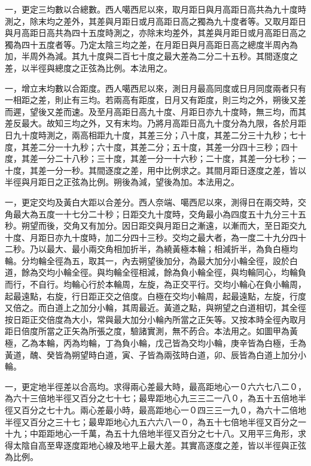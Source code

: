 \begin{pinyinscope}
一，更定三均數以合總數。西人噶西尼以來，取月距日與月高距日高共為九十度時測之，除末均之差外，其差與月距日或月高距日高之獨為九十度者等。又取月距日與月高距日高共為四十五度時測之，亦除末均差外，其差與月距日或月高距日高之獨為四十五度者等。乃定太陰三均之差，在月距日與月高距日高之總度半周內為加，半周外為減。其九十度與二百七十度之最大差為二分二十五秒。其間逐度之差，以半徑與總度之正弦為比例。本法用之。

一，增立末均數以合距度。西人噶西尼以來，測日月最高同度或日月同度兩者只有一相距之差，則止有三均。若兩高有距度，日月又有距度，則三均之外，朔後又差而遲，望後又差而速。及至月高距日高九十度、月距日亦九十度時，無三均，而其差反最大。故知三均之外，又有末均。乃將月高距日高九十度分為九限，各於月距日九十度時測之，兩高相距九十度，其差三分；八十度，其差二分三十九秒；七十度，其差二分一十九秒；六十度，其差二分；五十度，其差一分四十三秒；四十度，其差一分二十八秒；三十度，其差一分一十六秒；二十度，其差一分七秒；一十度，其差一分一秒。其間逐度之差，用中比例求之。其間月距日逐度之差，皆以半徑與月距日之正弦為比例。朔後為減，望後為加。本法用之。

一，更定交均及黃白大距以合差分。西人奈端、噶西尼以來，測得日在兩交時，交角最大為五度一十七分二十秒；日距交九十度時，交角最小為四度五十九分三十五秒。朔望而後，交角又有加分。因日距交與月距日之漸遠，以漸而大，至日距交九十度、月距日亦九十度時，加二分四十三秒。交均之最大者，為一度二十九分四十二秒。乃以最大、最小兩交角相加折半，為繞黃極本輪；相減折半，為負白極均輪。分均輪全徑為五，取其一，內去朔望後加分，為最大加分小輪全徑，設於白道，餘為交均小輪全徑。與均輪全徑相減，餘為負小輪全徑，與均輪同心，均輪負而行，不自行。均輪心行於本輪周，左旋，為正交平行。交均小輪心在負小輪周，起最遠點，右旋，行日距正交之倍度。白極在交均小輪周，起最遠點，左旋，行度又倍之。而白道上之加分小輪，其周最近。黃道之點，與朔望之白道相切，其全徑按日距正交倍度為大小，常與最大加分小輪內所當之正矢等。又按本時全徑內取月距日倍度所當之正矢為所張之度，驗諸實測，無不菂合。本法用之。如圖甲為黃極，乙為本輪，丙為均輪，丁為負小輪，戊己皆為交均小輪，庚辛皆為白極，壬為黃道，醜、癸皆為朔望時白道，寅、子皆為兩弦時白道，卯、辰皆為白道上加分小輪。

一，更定地半徑差以合高均。求得兩心差最大時，最高距地心一０六六七八二０，為六十三倍地半徑又百分之七十七；最卑距地心九三三二一八０，為五十五倍地半徑又百分之七十九。兩心差最小時，最高距地心一０四三三一九０，為六十二倍地半徑又百分之三十七；最卑距地心九五六六八一０，為五十七倍地半徑又百分之一十九；中距距地心一千萬，為五十九倍地半徑又百分之七十八。又用平三角形，求得太陰自高至卑逐度距地心線及地平上最大差。其實高逐度之差，皆以半徑與正弦為比例。


\end{pinyinscope}
